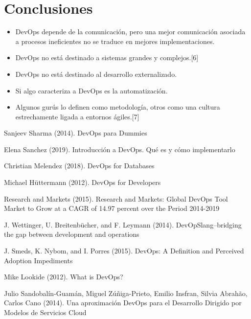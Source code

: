 \documentclass[twoside,twocolumn]{article}
\begin{document}
\section{Conclusiones}
\begin{itemize}
\item DevOps depende de la comunicación, pero una mejor comunicación asociada a procesos ineficientes no se traduce en mejores implementaciones.
\item DevOps no está destinado a sistemas grandes y complejos.[6]
\item DevOps no está destinado al desarrollo externalizado.
\item Si algo caracteriza a DevOps es la automatización.
\item Algunos gurús lo definen como metodología, otros como una cultura estrechamente ligada a entornos ágiles.[7]

\end{itemize}


\begin{thebibliography}{99} %
Sanjeev Sharma (2014).
\newblock DevOps para Dummies

Elena Sanchez (2019).
\newblock Introducción a DevOps. Qué es y cómo implementarlo

Christian Melendez (2018).
\newblock DevOps for Databases

Michael Hüttermann (2012).
\newblock DevOps for Developers

Research and Markets (2015).
\newblock Research and Markets: Global DevOps Tool Market to Grow at a CAGR of 14.97 percent  over the Period 2014-2019

J. Wettinger, U. Breitenbücher, and F. Leymann (2014).
\newblock DevOpSlang–bridging the gap between development and operations

J. Smeds, K. Nybom, and I. Porres (2015).
\newblock DevOps: A Definition and Perceived Adoption Impediments

Mike Lookide (2012).
\newblock What is DevOps?

Julio Sandobalín-Guamán,  Miguel Zúñiga-Prieto,  Emilio Insfran, Silvia Abrahão, Carlos Cano (2014).
\newblock Una aproximación DevOps para el Desarrollo Dirigido por Modelos de Servicios Cloud 
 
\end{thebibliography}

\end{document}
